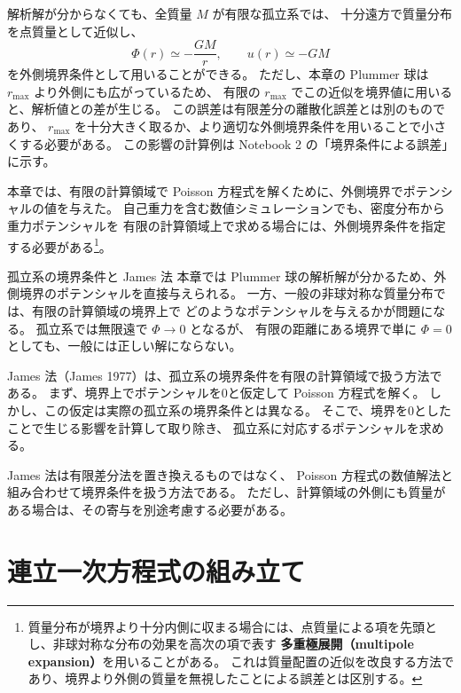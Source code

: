 解析解が分からなくても、全質量 $M$ が有限な孤立系では、
十分遠方で質量分布を点質量として近似し、
\begin{equation}
 \Phi(r)\simeq-\frac{GM}{r},
 \qquad
 u(r)\simeq-GM
\label{eq:ch2-outer-pointmass}
\end{equation}
を外側境界条件として用いることができる。
ただし、本章の Plummer 球は $r_{\max}$ より外側にも広がっているため、
有限の $r_{\max}$ でこの近似を境界値に用いると、解析値との差が生じる。
この誤差は有限差分の離散化誤差とは別のものであり、
$r_{\max}$ を十分大きく取るか、より適切な外側境界条件を用いることで小さくする必要がある。
この影響の計算例は Notebook 2 の「境界条件による誤差」に示す。

本章では、有限の計算領域で Poisson 方程式を解くために、外側境界でポテンシャルの値を与えた。
自己重力を含む数値シミュレーションでも、密度分布から重力ポテンシャルを
有限の計算領域上で求める場合には、外側境界条件を指定する必要がある\footnote{
質量分布が境界より十分内側に収まる場合には、点質量による項を先頭とし、非球対称な分布の効果を高次の項で表す
\textbf{多重極展開（multipole expansion）}を用いることがある\cite{tomisaka2007}。
これは質量配置の近似を改良する方法であり、境界より外側の質量を無視したことによる誤差とは区別する。
}。


\begin{topicblock}{孤立系の境界条件と James 法}
本章では Plummer 球の解析解が分かるため、外側境界のポテンシャルを直接与えられる。
一方、一般の非球対称な質量分布では、有限の計算領域の境界上で
どのようなポテンシャルを与えるかが問題になる。
孤立系では無限遠で $\Phi\to0$ となるが、
有限の距離にある境界で単に $\Phi=0$ としても、一般には正しい解にならない。

James 法（James 1977）は、孤立系の境界条件を有限の計算領域で扱う方法である\cite{james1977,bt2008}。
まず、境界上でポテンシャルを0と仮定して Poisson 方程式を解く。
しかし、この仮定は実際の孤立系の境界条件とは異なる。
そこで、境界を0としたことで生じる影響を計算して取り除き、
孤立系に対応するポテンシャルを求める。

James 法は有限差分法を置き換えるものではなく、
Poisson 方程式の数値解法と組み合わせて境界条件を扱う方法である。
ただし、計算領域の外側にも質量がある場合は、その寄与を別途考慮する必要がある。
\end{topicblock}

\section{連立一次方程式の組み立て}
\label{sec:ch2-matrix}

